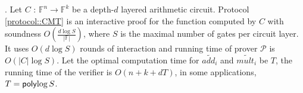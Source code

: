 \begin{theorem}\cite{VSA13}\cite{JT_Thesis}\cite{CMT}\cite{GKR}. Let $C$ : $\mathbb{F}^n \rightarrow \mathbb{F}^k$ be a depth-$d$ layered arithmetic circuit. Protocol \ref{protocol::CMT} is an interactive proof for the function computed by $C$ with soundness $O(\frac{d\log {S}}{|\mathbb{F}|})$, where $S$ is the maximal number of gates per circuit layer. It uses $O(d \log S)$ rounds of interaction and running time of prover $\mathcal{P}$ is $O(|C|\log S)$. Let the optimal computation time for $\tilde{add_i}$ and $\tilde{mult_i}$ be $T$, the running time of the verifier is $O(n+k+dT)$, in some applications, $T={\sf poly}{\log S}$. 
\end{theorem}